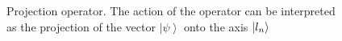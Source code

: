 \begin{figure}
\centering



\caption{Projection operator. The action of the operator can be interpreted as the projection of the vector $\left|\psi\right>$ onto the axis $\ket{l_n}$}
\label{figAddProject}
\end{figure}